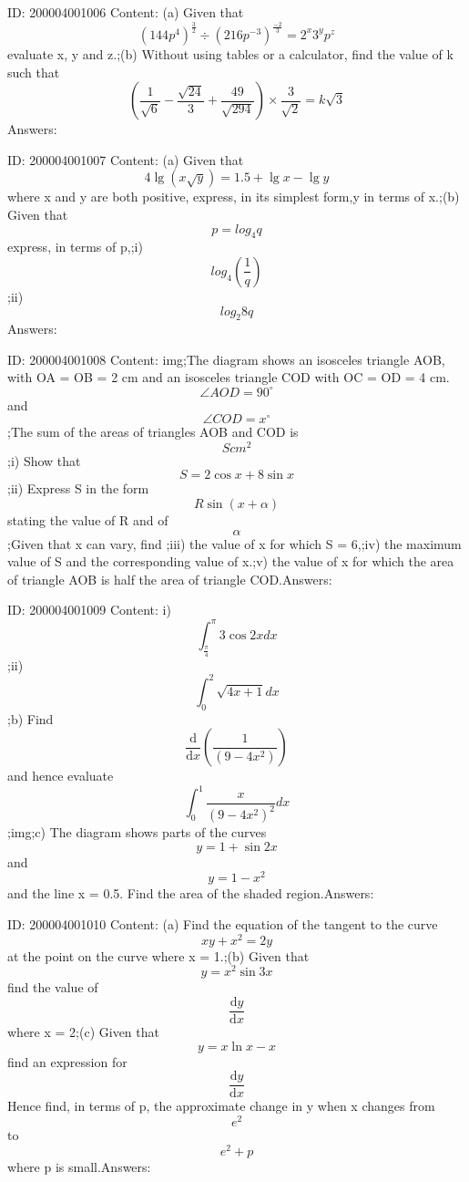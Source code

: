 \documentclass{article}
\begin{document}
ID: 200004001006
Content:
(a) Given that \[(144p^4)^{\frac{3}{2}}\div (216p^{-3})^{\frac{-2}{3}}=2^x3^yp^z\] evaluate x, y and z.;(b) Without using tables or a calculator, find the value of k such that \[(\frac{1}{\sqrt6}-\frac{\sqrt{24}}{3}+\frac{49}{\sqrt{294}}) \times  \frac{3}{\sqrt2} = k\sqrt3\] Answers:

ID: 200004001007
Content:
(a) Given that \[4\lg(x\sqrt y)=1.5+\lg x-\lg y\]where x and y are both positive, express, in its simplest form,y in terms of x.;(b) Given that \[p=log_4q\] express, in terms of p,;i) \[log_4(\frac{1}{q})\];ii) \[log_2 8q\]Answers:

ID: 200004001008
Content:
img;The diagram shows an isosceles triangle AOB, with OA = OB = 2 cm and an isosceles triangle COD with OC = OD = 4 cm. \[\angle AOD=90^{\circ}\] and \[\angle COD=x^{\circ}\];The sum of the areas of triangles AOB and COD is \[Scm^2\];i) Show that \[S=2\cos x+8\sin x\];ii) Express S in the form \[R\sin(x+\alpha)\] stating the value of R and of \[\alpha\];Given that x can vary, find ;iii) the value of x for which S = 6,;iv) the maximum value of S and the corresponding value of x.;v) the value of x for which the area of triangle AOB is half the area of triangle COD.Answers:

ID: 200004001009
Content:
i) \[\int_\frac{\pi}{4}^\pi 3\cos2xdx\];ii) \[\int_0^2\sqrt{4x+1}dx\];b) Find \[\frac{\mathrm{d} }{\mathrm{d} x}(\frac{1}{(9-4x^2)})\]  and hence evaluate \[\int_0^1 \frac{x}{(9-4x^2)^2}dx\];img;c) The diagram shows parts of the curves \[y = 1 + \sin2x\] and \[y=1-x^2\]  and the line x = 0.5. Find the area of the shaded region.Answers:

ID: 200004001010
Content:
(a)	Find the equation of the tangent to the curve \[xy+x^2=2y\] at the point on the curve where x = 1.;(b)	Given that \[y=x^2\sin3x\] find the value of \[\frac{\mathrm{d} y}{\mathrm{d} x}\] where x = 2;(c)	Given that \[y= x\ln x - x\] find an expression for \[\frac{\mathrm{d} y}{\mathrm{d} x}\]  Hence find, in terms of p, the approximate change in y when x changes from \[e^2\] to \[e^2+p\] where p is small.Answers:
\end{document}
